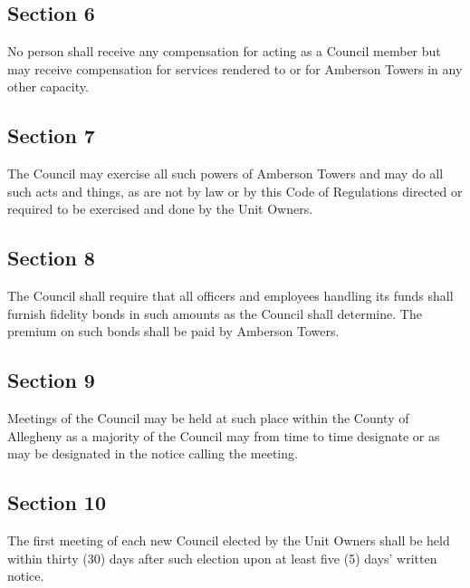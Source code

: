 \documentclass[
  14pt,
]{book}
\begin{document}
\hypertarget{section-6-1}{%
\subsection*{Section 6}\label{section-6-1}}

No person shall receive any compensation for acting as a Council member but may receive compensation for services rendered to or for Amberson Towers in any other capacity.

\hypertarget{section-7-1}{%
\subsection*{Section 7}\label{section-7-1}}

The Council may exercise all such powers of Amberson Towers and may do all such acts and things, as are not by law or by this Code of Regulations directed or required to be exercised and done by the Unit Owners.

\hypertarget{section-8-1}{%
\subsection*{Section 8}\label{section-8-1}}

The Council shall require that all officers and employees handling its funds shall furnish fidelity bonds in such amounts as the Council shall determine. The premium on such bonds shall be paid by Amberson Towers.

\hypertarget{section-9-1}{%
\subsection*{Section 9}\label{section-9-1}}

Meetings of the Council may be held at such place within the County of Allegheny as a majority of the Council may from time to time designate or as may be designated in the notice calling the meeting.

\hypertarget{section-10-1}{%
\subsection*{Section 10}\label{section-10-1}}

The first meeting of each new Council elected by the Unit Owners shall be held within thirty (30) days after such election upon at least five (5) days' written notice.
\end{document}
